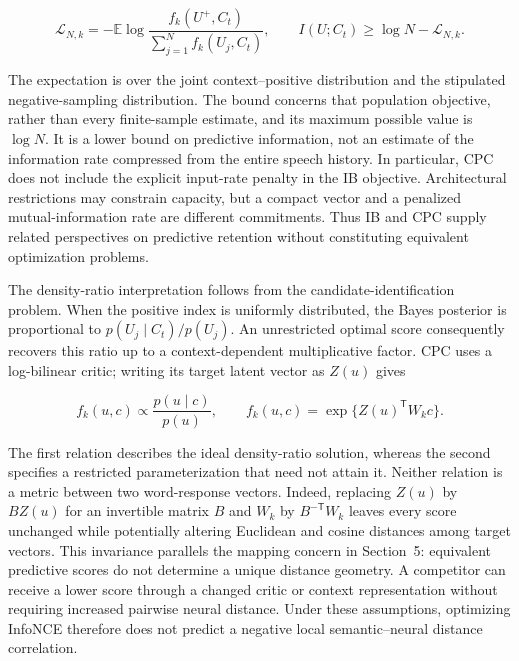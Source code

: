 \documentclass[11pt]{article}
\begin{document}
\begin{equation}
\mathcal L_{N,k}=-\mathbb E\log
\frac{f_k(U^+,C_t)}{\sum_{j=1}^{N}f_k(U_j,C_t)},\qquad
I(U;C_t)\ge\log N-\mathcal L_{N,k}.
\end{equation}

The expectation is over the joint context--positive distribution and the
stipulated negative-sampling distribution. The bound concerns that
population objective, rather than every finite-sample estimate, and its
maximum possible value is \(\log N\). It is a lower bound on predictive
information, not an estimate of the information rate compressed from the
entire speech history. In particular, CPC does not include the explicit
input-rate penalty in the IB objective. Architectural restrictions may
constrain capacity, but a compact vector and a penalized
mutual-information rate are different commitments. Thus IB and CPC
supply related perspectives on predictive retention without constituting
equivalent optimization problems.

The density-ratio interpretation follows from the
candidate-identification problem. When the positive index is uniformly
distributed, the Bayes posterior is proportional to
\(p(U_j\mid C_t)/p(U_j)\). An unrestricted optimal score consequently
recovers this ratio up to a context-dependent multiplicative factor. CPC
uses a log-bilinear critic; writing its target latent vector as \(Z(u)\)
gives

\begin{equation}
f_k(u,c)\propto\frac{p(u\mid c)}{p(u)},\qquad
f_k(u,c)=\exp\{Z(u)^{\mathsf T}W_kc\}.
\end{equation}

The first relation describes the ideal density-ratio solution, whereas
the second specifies a restricted parameterization that need not attain
it. Neither relation is a metric between two word-response vectors.
Indeed, replacing \(Z(u)\) by \(BZ(u)\) for an invertible matrix \(B\)
and \(W_k\) by \(B^{-\mathsf T}W_k\) leaves every score unchanged while
potentially altering Euclidean and cosine distances among target
vectors. This invariance parallels the mapping concern in Section~5:
equivalent predictive scores do not determine a unique distance
geometry. A competitor can receive a lower score through a changed
critic or context representation without requiring increased pairwise
neural distance. Under these assumptions, optimizing InfoNCE therefore
does not predict a negative local semantic--neural distance correlation.
\end{document}
